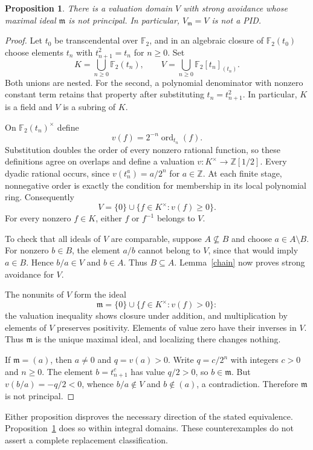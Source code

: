 \documentclass[11pt]{article}
\newtheorem{proposition}{Proposition}
\begin{document}
\begin{proposition}\label{domain}
There is a valuation domain $V$ with strong avoidance whose maximal ideal
$\mathfrak m$ is not principal. In particular, $V_{\mathfrak m}=V$ is not a PID.
\end{proposition}
\begin{proof}
Let $t_0$ be transcendental over $\mathbb F_2$, and in an algebraic closure
of $\mathbb F_2(t_0)$ choose elements $t_n$ with $t_{n+1}^2=t_n$ for $n\ge0$.
Set
\[
 K=\bigcup_{n\ge0}\mathbb F_2(t_n),\qquad
 V=\bigcup_{n\ge0}\mathbb F_2[t_n]_{(t_n)}.
\]
Both unions are nested. For the second, a polynomial denominator with
nonzero constant term retains that property after substituting
$t_n=t_{n+1}^2$. In particular, $K$ is a field and $V$ is a subring of $K$.

On $\mathbb F_2(t_n)^\times$ define
\[
 v(f)=2^{-n}\operatorname{ord}_{t_n}(f).
\]
Substitution doubles the order of every nonzero rational function, so these
definitions agree on overlaps and define a valuation
$v:K^\times\to\mathbb Z[1/2]$. Every dyadic rational occurs, since
$v(t_n^a)=a/2^n$ for $a\in\mathbb Z$. At each finite stage, nonnegative
order is exactly the condition for membership in its local polynomial ring.
Consequently
\[
 V=\{0\}\cup\{f\in K^\times:v(f)\ge0\}.
\]
For every nonzero $f\in K$, either $f$ or $f^{-1}$ belongs to $V$.

To check that all ideals of $V$ are comparable, suppose $A\nsubseteq B$
and choose $a\in A\setminus B$. For nonzero $b\in B$, the element $a/b$
cannot belong to $V$, since that would imply $a\in B$. Hence $b/a\in V$
and $b\in A$. Thus $B\subseteq A$. Lemma~\ref{chain} now proves strong
avoidance for $V$.

The nonunits of $V$ form the ideal
\[
 \mathfrak m=\{0\}\cup\{f\in K^\times:v(f)>0\}:
\]
the valuation inequality shows closure under addition, and multiplication
by elements of $V$ preserves positivity. Elements of value zero have
their inverses in $V$. Thus $\mathfrak m$ is the unique maximal ideal,
and localizing there changes nothing.

If $\mathfrak m=(a)$, then $a\ne0$ and $q=v(a)>0$. Write $q=c/2^n$ with
integers $c>0$ and $n\ge0$. The element $b=t_{n+1}^c$ has value $q/2>0$,
so $b\in\mathfrak m$. But $v(b/a)=-q/2<0$, whence $b/a\notin V$ and
$b\notin(a)$, a contradiction. Therefore $\mathfrak m$ is not principal.
\end{proof}

Either proposition disproves the necessary direction of the stated
equivalence. Proposition~\ref{domain} does so within integral domains.
These counterexamples do not assert a complete replacement classification.
\end{document}
